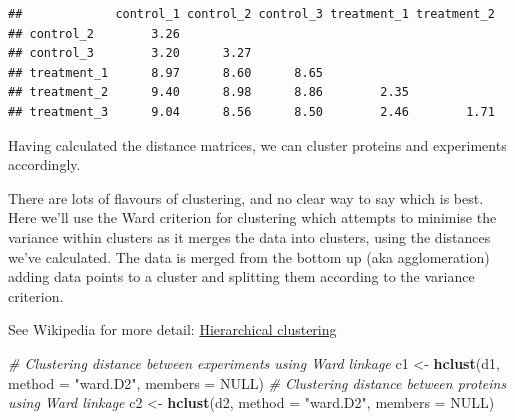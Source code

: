 \documentclass[12pt,]{book}
\newenvironment{Shaded}{\begin{snugshade}}{\end{snugshade}}
\newcommand{\KeywordTok}[1]{\textcolor[rgb]{0.13,0.29,0.53}{\textbf{#1}}}
\newcommand{\DataTypeTok}[1]{\textcolor[rgb]{0.13,0.29,0.53}{#1}}
\newcommand{\DecValTok}[1]{\textcolor[rgb]{0.00,0.00,0.81}{#1}}
\newcommand{\StringTok}[1]{\textcolor[rgb]{0.31,0.60,0.02}{#1}}
\newcommand{\CommentTok}[1]{\textcolor[rgb]{0.56,0.35,0.01}{\textit{#1}}}
\newcommand{\OtherTok}[1]{\textcolor[rgb]{0.56,0.35,0.01}{#1}}
\newcommand{\OperatorTok}[1]{\textcolor[rgb]{0.81,0.36,0.00}{\textbf{#1}}}
\newcommand{\NormalTok}[1]{#1}
\theoremstyle{definition}
\theoremstyle{definition}
\theoremstyle{definition}
\theoremstyle{remark}
\begin{document}
\begin{Shaded}
\end{Shaded}

\begin{verbatim}
##             control_1 control_2 control_3 treatment_1 treatment_2
## control_2        3.26                                            
## control_3        3.20      3.27                                  
## treatment_1      8.97      8.60      8.65                        
## treatment_2      9.40      8.98      8.86        2.35            
## treatment_3      9.04      8.56      8.50        2.46        1.71
\end{verbatim}

Having calculated the distance matrices, we can cluster proteins and
experiments accordingly.

There are lots of flavours of clustering, and no clear way to say which
is best. Here we'll use the Ward criterion for clustering which attempts
to minimise the variance within clusters as it merges the data into
clusters, using the distances we've calculated. The data is merged from
the bottom up (aka agglomeration) adding data points to a cluster and
splitting them according to the variance criterion.

See Wikipedia for more detail:
\href{https://en.wikipedia.org/wiki/Hierarchical_clustering}{Hierarchical
clustering}

\begin{Shaded}
\begin{Highlighting}[]
\CommentTok{# Clustering distance between experiments using Ward linkage}
\NormalTok{c1 <-}\StringTok{ }\KeywordTok{hclust}\NormalTok{(d1, }\DataTypeTok{method =} \StringTok{"ward.D2"}\NormalTok{, }\DataTypeTok{members =} \OtherTok{NULL}\NormalTok{)}
\CommentTok{# Clustering distance between proteins using Ward linkage}
\NormalTok{c2 <-}\StringTok{ }\KeywordTok{hclust}\NormalTok{(d2, }\DataTypeTok{method =} \StringTok{"ward.D2"}\NormalTok{, }\DataTypeTok{members =} \OtherTok{NULL}\NormalTok{)}
\end{Highlighting}
\end{Shaded}
\end{document}
